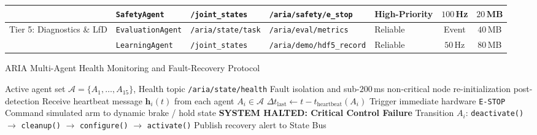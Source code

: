 \documentclass[journal]{IEEEtran}
\begin{document}
\begin{table}[!t]
{\begin{tabular}{lllllcc}
 & \texttt{SafetyAgent} & \texttt{/joint\_states} & \texttt{/aria/safety/e\_stop} & High-Priority & $100$\,Hz & $20$\,MB \\
\midrule
\multirow{2}{*}{Tier 5: Diagnostics \& LfD} & \texttt{EvaluationAgent} & \texttt{/aria/state/task} & \texttt{/aria/eval/metrics} & Reliable & Event & $40$\,MB \\
 & \texttt{LearningAgent} & \texttt{/joint\_states} & \texttt{/aria/demo/hdf5\_record} & Reliable & $50$\,Hz & $80$\,MB \\
\bottomrule
\end{tabular}%
}
\end{table}

\begin{algorithm}[!t]
\caption{ARIA Multi-Agent Health Monitoring and Fault-Recovery Protocol}
\label{alg_health}
\begin{algorithmic}[1]
\REQUIRE Active agent set $\mathcal{A} = \{A_1, \dots, A_{15}\}$, Health topic \texttt{/aria/state/health}
\ENSURE Fault isolation and sub-$200$\,ms non-critical node re-initialization post-detection
    \STATE Receive heartbeat message $\mathbf{h}_i(t)$ from each agent $A_i \in \mathcal{A}$
        \STATE $\Delta t_{\text{last}} \leftarrow t - t_{\text{heartbeat}}(A_i)$
                \STATE Trigger immediate hardware \texttt{E-STOP}
                \STATE Command simulated arm to dynamic brake / hold state
                \RETURN \textbf{SYSTEM HALTED: Critical Control Failure}
            \ELSE
                \STATE Transition $A_i$: \texttt{deactivate()} $\to$ \texttt{cleanup()} $\to$ \texttt{configure()} $\to$ \texttt{activate()}
                \STATE Publish recovery alert to State Bus
            \ENDIF
        \ENDIF
    \ENDFOR
\ENDWHILE
\end{algorithmic}
\end{algorithm}
\end{document}
